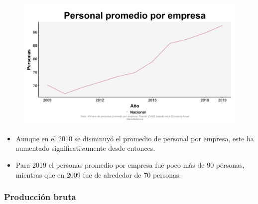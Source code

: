     \begin{figure}[H]
        \caption[Personal promedio por empresa a nivel nacional ]{\label{personal_promedio_nacional} }
        \begin{center}
        \includegraphics[width=\textwidth,keepaspectratio]{img/var_221_trend.png}
        \end{center}
    \end{figure}
            \begin{itemize}
                    \item Aunque en el 2010 se disminuyó el promedio de personal por empresa, este ha aumentado significativamente desde entonces.
                    \item Para 2019 el personas promedio por empresa fue poco más de 90 personas, mientras que en 2009 fue de alrededor de 70 personas.
                    \end{itemize}

        \subsubsection{Producción bruta}

